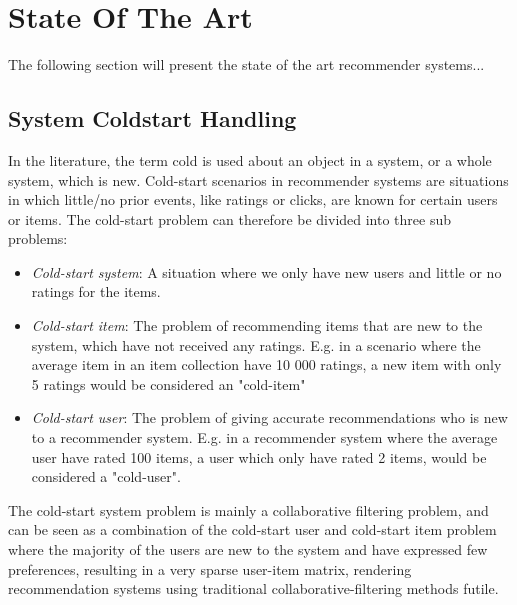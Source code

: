 
\section{State Of The Art}

The following section will present the state of the art recommender systems...

\subsection{System Coldstart Handling}


In the literature, the term cold is used about an object in a system, or a
whole system, which is new. Cold-start scenarios in recommender systems are
situations in which little/no prior events, like ratings or clicks, are known
for certain users or items. The cold-start problem can therefore be divided
  into three sub problems:

\begin{itemize}
  \item \emph{Cold-start system}: A situation where we only have new users and
  little or no ratings for the items.
	
  \item \emph{Cold-start item}: The problem of recommending items that are new
  to the system, which have not received any ratings. E.g. in a scenario where
  the average item in an item collection have 10 000 ratings, a new item with
  only 5 ratings would be considered an "cold-item"
	
  \item \emph{Cold-start user}: The problem of giving accurate recommendations
  who is new to a recommender system. E.g. in a recommender system where the
  average user have rated 100 items, a user which only have rated 2 items,
  would be considered a "cold-user".
\end{itemize}

The cold-start system problem is mainly a collaborative filtering problem, and
can be seen as a combination of the cold-start user and cold-start item problem
where the majority of the users are new to the system and have expressed few
preferences, resulting in a very sparse user-item matrix, rendering
recommendation systems using traditional collaborative-filtering methods
futile.

